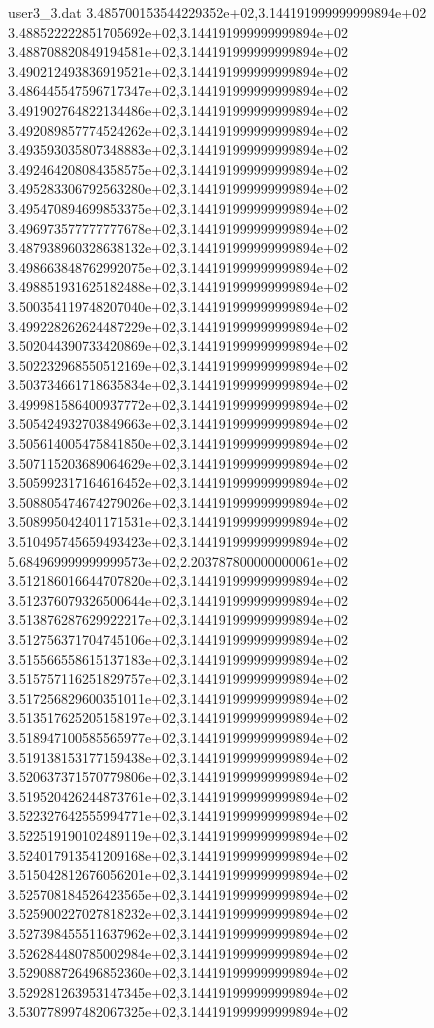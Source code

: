 \begin{filecontents}{user3_3.dat}
3.485700153544229352e+02,3.144191999999999894e+02
3.488522222851705692e+02,3.144191999999999894e+02
3.488708820849194581e+02,3.144191999999999894e+02
3.490212493836919521e+02,3.144191999999999894e+02
3.486445547596717347e+02,3.144191999999999894e+02
3.491902764822134486e+02,3.144191999999999894e+02
3.492089857774524262e+02,3.144191999999999894e+02
3.493593035807348883e+02,3.144191999999999894e+02
3.492464208084358575e+02,3.144191999999999894e+02
3.495283306792563280e+02,3.144191999999999894e+02
3.495470894699853375e+02,3.144191999999999894e+02
3.496973577777777678e+02,3.144191999999999894e+02
3.487938960328638132e+02,3.144191999999999894e+02
3.498663848762992075e+02,3.144191999999999894e+02
3.498851931625182488e+02,3.144191999999999894e+02
3.500354119748207040e+02,3.144191999999999894e+02
3.499228262624487229e+02,3.144191999999999894e+02
3.502044390733420869e+02,3.144191999999999894e+02
3.502232968550512169e+02,3.144191999999999894e+02
3.503734661718635834e+02,3.144191999999999894e+02
3.499981586400937772e+02,3.144191999999999894e+02
3.505424932703849663e+02,3.144191999999999894e+02
3.505614005475841850e+02,3.144191999999999894e+02
3.507115203689064629e+02,3.144191999999999894e+02
3.505992317164616452e+02,3.144191999999999894e+02
3.508805474674279026e+02,3.144191999999999894e+02
3.508995042401171531e+02,3.144191999999999894e+02
3.510495745659493423e+02,3.144191999999999894e+02
5.684969999999999573e+02,2.203787800000000061e+02
3.512186016644707820e+02,3.144191999999999894e+02
3.512376079326500644e+02,3.144191999999999894e+02
3.513876287629922217e+02,3.144191999999999894e+02
3.512756371704745106e+02,3.144191999999999894e+02
3.515566558615137183e+02,3.144191999999999894e+02
3.515757116251829757e+02,3.144191999999999894e+02
3.517256829600351011e+02,3.144191999999999894e+02
3.513517625205158197e+02,3.144191999999999894e+02
3.518947100585565977e+02,3.144191999999999894e+02
3.519138153177159438e+02,3.144191999999999894e+02
3.520637371570779806e+02,3.144191999999999894e+02
3.519520426244873761e+02,3.144191999999999894e+02
3.522327642555994771e+02,3.144191999999999894e+02
3.522519190102489119e+02,3.144191999999999894e+02
3.524017913541209168e+02,3.144191999999999894e+02
3.515042812676056201e+02,3.144191999999999894e+02
3.525708184526423565e+02,3.144191999999999894e+02
3.525900227027818232e+02,3.144191999999999894e+02
3.527398455511637962e+02,3.144191999999999894e+02
3.526284480785002984e+02,3.144191999999999894e+02
3.529088726496852360e+02,3.144191999999999894e+02
3.529281263953147345e+02,3.144191999999999894e+02
3.530778997482067325e+02,3.144191999999999894e+02

\end{filecontents}
